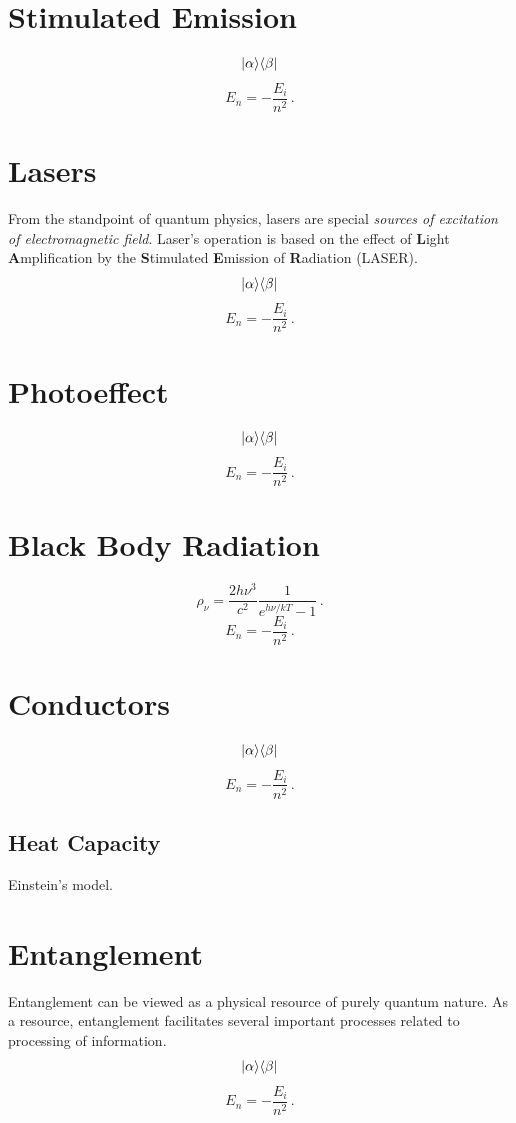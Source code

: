 \section{Stimulated Emission}
\[
|{\alpha}\rangle\langle{\beta}|
\]
\[
E_n = -\frac{E_i}{n^2}\,.
\]

\section{Lasers}
From the standpoint of quantum physics, lasers are special \emph{sources of excitation of electromagnetic field}. Laser's operation is based on the effect of {\bf L}ight {\bf A}mplification by the {\bf S}timulated {\bf E}mission of {\bf R}adiation (LASER).
\[
|{\alpha}\rangle\langle{\beta}|
\]
\[
E_n = -\frac{E_i}{n^2}\,.
\]



\section{Photoeffect}
\[
|{\alpha}\rangle\langle{\beta}|
\]
\[
E_n = -\frac{E_i}{n^2}\,.
\]

\section{Black Body Radiation}
\[
\rho_\nu = \frac{2h\nu^3}{c^2}\frac{1}{e^{h\nu/kT}-1}\,.
\]
\[
E_n = -\frac{E_i}{n^2}\,.
\]

\section{Conductors}
\[
|{\alpha}\rangle\langle{\beta}|
\]
\[
E_n = -\frac{E_i}{n^2}\,.
\]

\subsection{Heat Capacity}
Einstein's model.

\section{Entanglement}
Entanglement can be viewed as a physical resource of purely quantum nature. As a resource, entanglement facilitates several important processes related to processing of information.
\[
|{\alpha}\rangle\langle{\beta}|
\]
\[
E_n = -\frac{E_i}{n^2}\,.
\]

